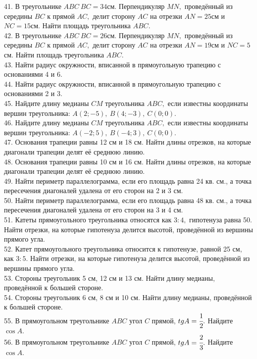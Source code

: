 41. В треугольнике $ABC\ BC=34$см. Перпендикуляр $MN,$ проведённый из середины $BC$ к прямой $AC,$ делит сторону $AC$ на отрезки $AN=25$см и $NC=15$см. Найти площадь треугольника $ABC.$\\
42. В треугольнике $ABC\ BC=26$см. Перпендикуляр $MN,$ проведённый из середины $BC$ к прямой $AC,$ делит сторону $AC$ на отрезки $AN=19$см и $NC=5$см. Найти площадь треугольника $ABC.$\\
43. Найти радиус окружности, вписанной в прямоугольную трапецию с основаниями 4 и 6.\\
44. Найти радиус окружности, вписанной в прямоугольную трапецию с основаниями 2 и 3.\\
45. Найдите длину медианы $CM$ треугольника $ABC,$ если известны координаты вершин треугольника: $A(2;-5),\ B(4;-3),\ C(0;0).$\\
46. Найдите длину медианы $CM$ треугольника $ABC,$ если известны координаты вершин треугольника: $A(-2;5),\ B(-4;3),\ C(0;0).$\\
47. Основания трапеции равны 12 см и 18 см. Найти длины отрезков, на которые диагонали трапеции делят её среднюю линию.\\
48. Основания трапеции равны 10 см и 16 см. Найти длины отрезков, на которые диагонали трапеции делят её среднюю линию.\\
49. Найти периметр параллелограмма, если его площадь равна 24 кв. см., а точка пересечения диагоналей удалена от его сторон на 2 и 3 см.\\
50. Найти периметр параллелограмма, если его площадь равна 48 кв. см., а точка пересечения диагоналей удалена от его сторон на 3 и 4 см.\\
51. Катеты прямоугольного треугольника относятся как $3:4,$ гипотенуза равна 50. Найти отрезки, на которые гипотенуза делится высотой, проведённой из вершины прямого угла.\\
52. Катет прямоугольного треугольника относится к гипотенузе, равной 25 см, как $3:5.$ Найти отрезки, на которые гипотенуза делится высотой, проведённой из вершины прямого угла.\\
53. Стороны треугольник 5 см, 12 см и 13 см. Найти длину медианы, проведённой к большей стороне.\\
54. Стороны треугольник 6 см, 8 см и 10 см. Найти длину медианы, проведённой к большей стороне.\\
55. В прямоугольном треугольнике $ABC$ угол $C$ прямой, $tg A=\cfrac{1}{2}.$ Найдите $\cos A.$\\
56. В прямоугольном треугольнике $ABC$ угол $C$ прямой, $tg A=\cfrac{2}{3}.$ Найдите $\cos A.$\\
